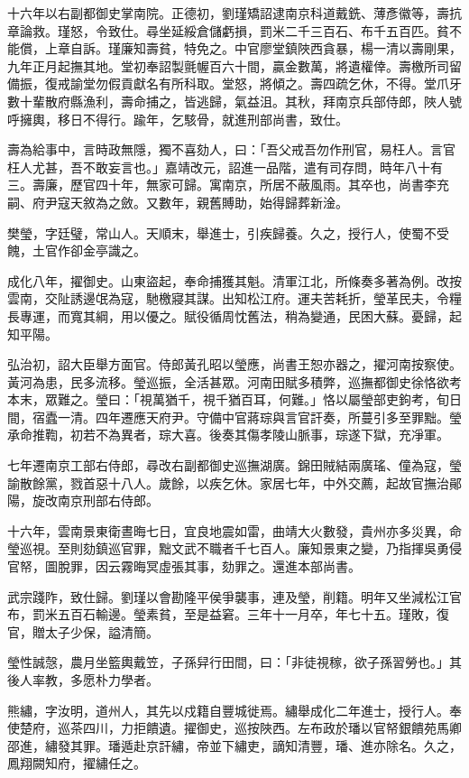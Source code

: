 \begin{pinyinscope}
十六年以右副都御史掌南院。正德初，劉瑾矯詔逮南京科道戴銑、薄彥徽等，壽抗章論救。瑾怒，令致仕。尋坐延綏倉儲虧損，罰米二千三百石、布千五百匹。貧不能償，上章自訴。瑾廉知壽貧，特免之。中官廖堂鎮陜西貪暴，楊一清以壽剛果，九年正月起撫其地。堂初奉詔製氈幄百六十間，贏金數萬，將遺權倖。壽檄所司留備振，復戒諭堂勿假貢獻名有所科取。堂怒，將傾之。壽四疏乞休，不得。堂爪牙數十輩散府縣漁利，壽命捕之，皆逃歸，氣益沮。其秋，拜南京兵部侍郎，陜人號呼擁輿，移日不得行。踰年，乞駭骨，就進刑部尚書，致仕。

壽為給事中，言時政無隱，獨不喜劾人，曰：「吾父戒吾勿作刑官，易枉人。言官枉人尤甚，吾不敢妄言也。」嘉靖改元，詔進一品階，遣有司存問，時年八十有三。壽廉，歷官四十年，無家可歸。寓南京，所居不蔽風雨。其卒也，尚書李充嗣、府尹寇天敘為之斂。又數年，親舊賻助，始得歸葬新淦。

樊瑩，字廷璧，常山人。天順末，舉進士，引疾歸養。久之，授行人，使蜀不受餽，土官作卻金亭識之。

成化八年，擢御史。山東盜起，奉命捕獲其魁。清軍江北，所條奏多著為例。改按雲南，交阯誘邊氓為寇，馳檄寢其謀。出知松江府。運夫苦耗折，瑩革民夫，令糧長專運，而寬其綱，用以優之。賦役循周忱舊法，稍為變通，民困大蘇。憂歸，起知平陽。

弘治初，詔大臣舉方面官。侍郎黃孔昭以瑩應，尚書王恕亦器之，擢河南按察使。黃河為患，民多流移。瑩巡振，全活甚眾。河南田賦多積弊，巡撫都御史徐恪欲考本末，眾難之。瑩曰：「視萬猶千，視千猶百耳，何難。」恪以屬瑩部吏鉤考，旬日間，宿蠹一清。四年遷應天府尹。守備中官蔣琮與言官訐奏，所蔓引多至罪黜。瑩承命推鞫，初若不為異者，琮大喜。後奏其傷孝陵山脈事，琮遂下獄，充凈軍。

七年遷南京工部右侍郎，尋改右副都御史巡撫湖廣。錦田賊結兩廣瑤、僮為寇，瑩諭散餘黨，戮首惡十八人。歲餘，以疾乞休。家居七年，中外交薦，起故官撫治鄖陽，旋改南京刑部右侍郎。

十六年，雲南景東衛晝晦七日，宜良地震如雷，曲靖大火數發，貴州亦多災異，命瑩巡視。至則劾鎮巡官罪，黜文武不職者千七百人。廉知景東之變，乃指揮吳勇侵官帑，圖脫罪，因云霧晦冥虛張其事，劾罪之。還進本部尚書。

武宗踐阼，致仕歸。劉瑾以會勘隆平侯爭襲事，連及瑩，削籍。明年又坐減松江官布，罰米五百石輸邊。瑩素貧，至是益窘。三年十一月卒，年七十五。瑾敗，復官，贈太子少保，謚清簡。

瑩性誠愨，農月坐籃輿戴笠，子孫舁行田間，曰：「非徒視稼，欲子孫習勞也。」其後人率教，多愿朴力學者。

熊繡，字汝明，道州人，其先以戍籍自豐城徙焉。繡舉成化二年進士，授行人。奉使楚府，巡茶四川，力拒饋遺。擢御史，巡按陜西。左布政於璠以官帑銀饋苑馬卿邵進，繡發其罪。璠遁赴京訐繡，帝並下繡吏，謫知清豐，璠、進亦除名。久之，鳳翔闕知府，擢繡任之。


\end{pinyinscope}
